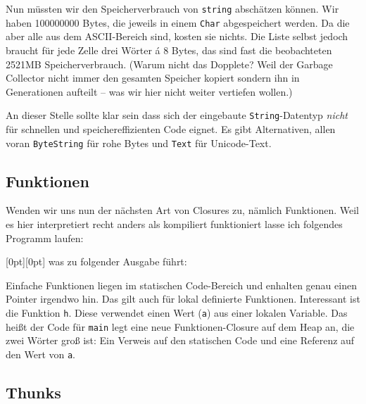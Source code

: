 \documentclass[11pt,DIV=12,parskip=half,headings=normal,abstract]{scrartcl}
\newcommand{\mylabel}[1]{\raisebox{2em}[0pt][0pt]{\makebox[0pt][l]{\makebox[\linewidth][r]{\color{gray}{#1}\hspace{2em}}}}}
\newcommand{\li}{\lstinline[style=haskell]}
\begin{document}
Nun müssten wir den Speicherverbrauch von \li-string- abschätzen können. Wir haben 100000000 Bytes, die jeweils in einem \li-Char- abgespeichert werden. Da die aber alle aus dem ASCII-Bereich sind, kosten sie nichts. Die Liste selbst jedoch braucht für jede Zelle drei Wörter á 8 Bytes, das sind fast die beobachteten 2521MB Speicherverbrauch. (Warum nicht das Dopplete? Weil der Garbage Collector nicht immer den gesamten Speicher kopiert sondern ihn in Generationen aufteilt – was wir hier nicht weiter vertiefen wollen.)

An dieser Stelle sollte klar sein dass sich der eingebaute \li-String--Datentyp \emph{nicht} für schnellen und speichereffizienten Code eignet. Es gibt Alternativen, allen voran \li-ByteString- für rohe Bytes und \li-Text- für Unicode-Text.

\subsection{Funktionen}

Wenden wir uns nun der nächsten Art von Closures zu, nämlich Funktionen. Weil es hier interpretiert recht anders als kompiliert funktioniert lasse ich folgendes Programm laufen:

\mylabel{Haskell}
was zu folgender Ausgabe führt:

Einfache Funktionen liegen im statischen Code-Bereich und enhalten genau einen Pointer irgendwo hin. Das gilt auch für lokal definierte Funktionen. Interessant ist die Funktion \li-h-. Diese verwendet einen Wert (\li-a-) aus einer lokalen Variable. Das heißt der Code für \li-main- legt eine neue Funktionen-Closure auf dem Heap an, die zwei Wörter groß ist: Ein Verweis auf den statischen Code und eine Referenz auf den Wert von \li-a-. 

\subsection{Thunks}
\end{document}
